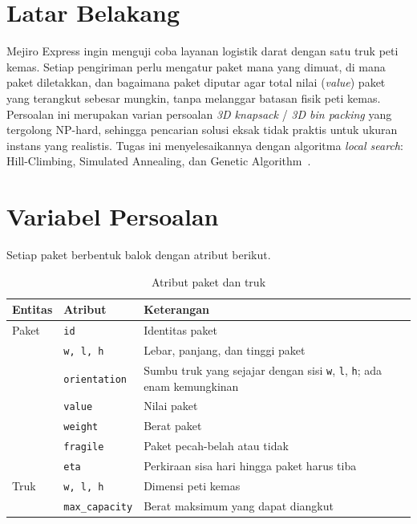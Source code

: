 \section{Latar Belakang}

Mejiro Express ingin menguji coba layanan logistik darat dengan satu truk peti kemas.
Setiap pengiriman perlu mengatur paket mana yang dimuat, di mana paket diletakkan,
dan bagaimana paket diputar agar total nilai (\textit{value}) paket yang terangkut
sebesar mungkin, tanpa melanggar batasan fisik peti kemas. Persoalan ini merupakan
varian persoalan \textit{3D knapsack} / \textit{3D bin packing} yang tergolong NP-hard,
sehingga pencarian solusi eksak tidak praktis untuk ukuran instans yang realistis.
Tugas ini menyelesaikannya dengan algoritma \textit{local search}: Hill-Climbing,
Simulated Annealing, dan Genetic Algorithm~\cite{asisten2026spek}.

\section{Variabel Persoalan}

Setiap paket berbentuk balok dengan atribut berikut.

\begin{table}[H]
	\centering
	\caption{Atribut paket dan truk}
	\label{tab:atribut}
	\begin{tabular}{l l p{8cm}}
		\toprule
		\textbf{Entitas} & \textbf{Atribut} & \textbf{Keterangan} \\
		\midrule
		Paket & \texttt{id} & Identitas paket \\
		& \texttt{w, l, h} & Lebar, panjang, dan tinggi paket \\
		& \texttt{orientation} & Sumbu truk yang sejajar dengan sisi \texttt{w}, \texttt{l}, \texttt{h}; ada enam kemungkinan \\
		& \texttt{value} & Nilai paket \\
		& \texttt{weight} & Berat paket \\
		& \texttt{fragile} & Paket pecah-belah atau tidak \\
		& \texttt{eta} & Perkiraan sisa hari hingga paket harus tiba \\
		\midrule
		Truk & \texttt{w, l, h} & Dimensi peti kemas \\
		& \texttt{max\_capacity} & Berat maksimum yang dapat diangkut \\
		\bottomrule
	\end{tabular}
\end{table}

